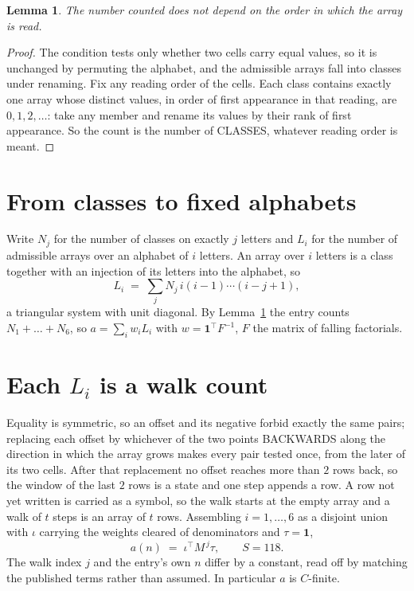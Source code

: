\documentclass[11pt,a4paper]{article}
\theoremstyle{plain}
\newtheorem{lemma}[theorem]{Lemma}
\theoremstyle{definition}
\begin{document}
\begin{lemma}\label{lem:order}
The number counted does not depend on the order in which the array is read.
\end{lemma}

\begin{proof}
The condition tests only whether two cells carry equal values, so it is unchanged by permuting
the alphabet, and the admissible arrays fall into classes under renaming. Fix any reading order
of the cells. Each class contains exactly one array whose distinct values, in order of first
appearance in that reading, are $0,1,2,\dots$: take any member and rename its values by their
rank of first appearance. So the count is the number of CLASSES, whatever reading order is
meant.
\end{proof}

\section{From classes to fixed alphabets}

Write $N_j$ for the number of classes on exactly $j$ letters and $L_i$ for the number of
admissible arrays over an alphabet of $i$ letters. An array over $i$ letters is a class together
with an injection of its letters into the alphabet, so
\[
L_i\;=\;\sum_j N_j\,i(i-1)\cdots(i-j+1),
\]
a triangular system with unit diagonal. By Lemma~\ref{lem:order} the entry counts
$N_1+\dots+N_{6}$, so $a=\sum_i w_iL_i$ with $w=\mathbf{1}^{\!\top}F^{-1}$, $F$ the
matrix of falling factorials.

\section{Each $L_i$ is a walk count}

Equality is symmetric, so an offset and its negative forbid exactly the same pairs; replacing
each offset by whichever of the two points BACKWARDS along the direction in which the array
grows makes every pair tested once, from the later of its two cells. After that replacement no
offset reaches more than $2$ rows back, so the window of the last $2$
rows is a state and one step appends a row. A row not yet written is
carried as a symbol, so the walk starts at the empty array and a walk of $t$ steps is an array
of $t$ rows. Assembling $i=1,\dots,6$ as a disjoint union with $\iota$ carrying the
weights cleared of denominators and $\tau=\mathbf{1}$,
\[
a(n)\;=\;\iota^{\!\top}M^{\,j}\tau ,\qquad S=118.
\]
The walk index $j$ and the entry's own $n$ differ by a constant, read off by matching the
published terms rather than assumed. In particular $a$ is $C$-finite.
\end{document}
